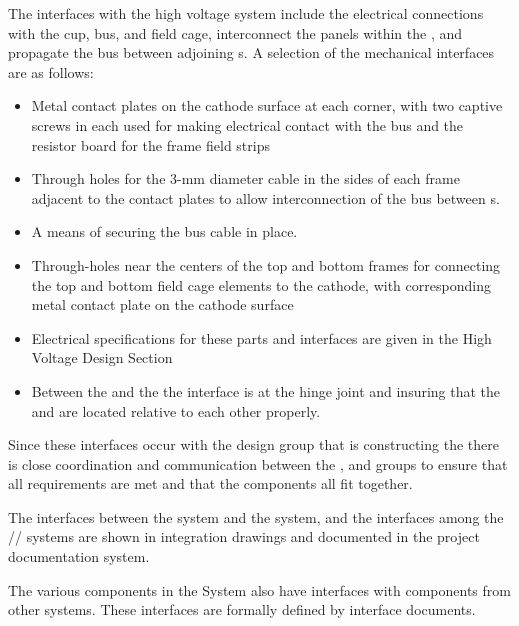 The interfaces with the high voltage system include the electrical connections with the  cup,  bus, and field cage, interconnect the panels within the , and propagate the  bus between adjoining s.  A selection of the mechanical interfaces are as follows:
\begin{itemize}
\item Metal contact plates on the cathode surface at each corner, with two captive screws in each used for making electrical contact with the  bus and the resistor board for the frame field strips
\item Through holes for the 3-mm diameter cable in the sides of each frame adjacent to the contact plates to allow interconnection of the  bus between s.
\item A means of securing the  bus cable in place.
\item Through-holes near the centers of the top and bottom frames for connecting the top and bottom field cage elements to the cathode, with corresponding metal contact plate on the cathode surface
\item Electrical specifications for these parts and interfaces are given in the High Voltage Design Section
\item Between the  and the  the interface is at the hinge joint and insuring that the  and  are located relative to each other properly.
\end{itemize}

Since these interfaces occur with the design group that is constructing the  there is close coordination and communication between the ,  and  groups to ensure that all requirements are met and that the components all fit together.  

The interfaces between the  system and the  system, and the interfaces among the // systems are shown in integration drawings and documented in the project documentation system.


The various components in the  System also have interfaces with components from other systems.  These interfaces are formally defined by interface documents. 
 
